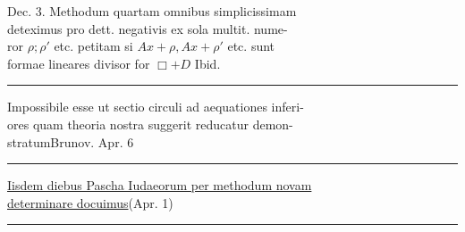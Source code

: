 \medskip
\noindent\DiaryHashSeven\quad Dec. 3. Methodum quartam  omnibus simplicissimam\\
deteximus pro dett. negativis ex sola multit. nume-\\
ror \(\rho;\rho'\) etc. petitam si \(Ax+\rho,Ax+\rho'\) etc. sunt\\
formae lineares divisor for \(\Box+D\) \hfill Ibid.
\par\smallskip\noindent\rule{\linewidth}{.3pt}

\noindent{}\quad Impossibile esse ut sectio circuli ad aequationes inferi-\\
ores quam theoria nostra suggerit reducatur demon-\\
stratum\hfill Brunov. Apr. 6
\par\smallskip\noindent\rule{\linewidth}{.3pt}

\noindent\underline{Iisdem diebus Pascha Iudaeorum per methodum novam}\\
\underline{determinare docuimus}\quad (Apr. 1)
\par\smallskip\noindent\rule{\linewidth}{.3pt}

